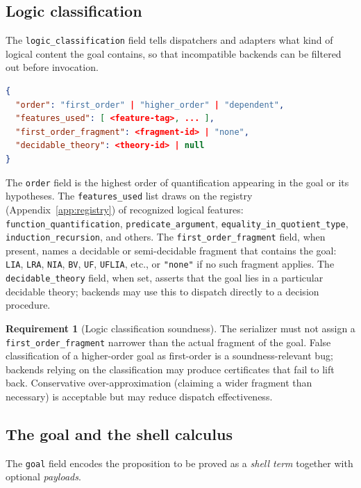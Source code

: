\documentclass[11pt,letterpaper]{article}
\theoremstyle{definition}
\newtheorem{requirement}{Requirement}[section]
\theoremstyle{remark}
\begin{document}
\subsection{Logic classification}
\label{sec:ir-logic}

The \texttt{logic\_classification} field tells dispatchers and adapters
what kind of logical content the goal contains, so that
incompatible backends can be filtered out before invocation.

\begin{lstlisting}[language=json]
{
  "order": "first_order" | "higher_order" | "dependent",
  "features_used": [ <feature-tag>, ... ],
  "first_order_fragment": <fragment-id> | "none",
  "decidable_theory": <theory-id> | null
}
\end{lstlisting}

The \texttt{order} field is the highest order of quantification appearing
in the goal or its hypotheses. The \texttt{features\_used} list draws on
the registry (Appendix~\ref{app:registry}) of recognized logical features:
\texttt{function\_quantification}, \texttt{predicate\_argument},
\texttt{equality\_in\_quotient\_type}, \texttt{induction\_recursion}, and
others. The \texttt{first\_order\_fragment} field, when present, names a
decidable or semi-decidable fragment that contains the goal: \texttt{LIA},
\texttt{LRA}, \texttt{NIA}, \texttt{BV}, \texttt{UF}, \texttt{UFLIA}, etc.,
or \texttt{"none"} if no such fragment applies. The
\texttt{decidable\_theory} field, when set, asserts that the goal lies in
a particular decidable theory; backends may use this to dispatch directly
to a decision procedure.

\begin{requirement}[Logic classification soundness]
The serializer must not assign a \texttt{first\_order\_fragment} narrower
than the actual fragment of the goal. False classification of a
higher-order goal as first-order is a soundness-relevant bug; backends
relying on the classification may produce certificates that fail to lift
back. Conservative over-approximation (claiming a wider fragment than
necessary) is acceptable but may reduce dispatch effectiveness.
\end{requirement}

\subsection{The goal and the shell calculus}
\label{sec:ir-shell}

The \texttt{goal} field encodes the proposition to be proved as a
\emph{shell term} together with optional \emph{payloads}.
\end{document}
